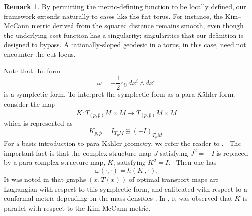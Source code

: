 \documentclass[12pt,letterpaper]{amsart}%
\newcounter{mycounter}
\numberwithin{mycounter}{section}
\theoremstyle{plain}
\numberwithin{equation}{section}
\theoremstyle{definition}
\newtheorem{remark}[mycounter]{Remark}
\begin{document}








\begin{remark} 
By permitting the metric-defining function to be locally defined, our framework extends naturally to cases like the flat torus. For instance, the Kim–McCann metric derived from the squared distance remains smooth, even though the underlying cost function has a singularity; singularities that our definition is designed to bypass.
A rationally-sloped geodesic in a torus, in this case, need not encounter the cut-locus.   
\end{remark}
 Note that the form
 \[
\omega = -\frac{1}{2} c_{i\bar{s}}\, dx^{i} \wedge d\bar{x}^{s}
\]
is a symplectic form. To interpret the symplectic form as a para-K\"{a}hler form, consider the map
\[
K:T_{\left(  p,\bar{p}\right)  }M\times\bar{M}\rightarrow T_{\left(  p,\bar
{p}\right)  }M\times\bar{M}%
\]
which is represented as
\begin{equation}\label{defineK}
K_{p,\bar{p}}=I_{T_{p}M}\oplus\left(  -I\right)  _{T_{\bar{p}}\bar{M}}.
\end{equation}
For a basic introduction to para-K\"{a}hler geometry, we refer the reader to \cite{Para}. \ The
important fact is that the complex structure map $J$ satisfying $J^{2}=-I$ is
replaced by a para-complex structure map, $K$, satisfying $K^{2}=I$. \ Then one has
\[
\omega(\cdot,\cdot)=h(K\cdot,\cdot).
\]
It was noted in \cite{KM} that graphs $\left(  x,T(x)\right)  $ of optimal
transport maps are Lagrangian with respect to this symplectic form, and calibrated with respect to a conformal metric depending on the mass densities \cite{KMW}. In \cite[Claim 2.2]{W2025}, it was observed that  $K$ is parallel with respect to the
Kim-McCann metric.
\end{document}
